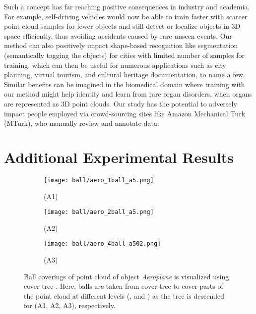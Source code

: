\documentclass{article}
\begin{document}
Such a concept has far reaching positive consequences in industry and academia. For example, self-driving vehicles would now be able to train faster with scarcer point cloud samples for fewer objects and still detect or localize objects in 3D space efficiently, thus avoiding accidents caused by rare unseen events.
Our method can also positively impact shape-based recognition like segmentation (semantically tagging the objects) for cities with limited number of samples for training, which can then be useful for numerous applications such as city planning, virtual tourism, and cultural heritage documentation, to name a few. Similar benefits can be imagined in the biomedical domain where training with our method might help identify and learn from rare organ disorders, when organs are represented as 3D point clouds. Our study has the potential to adversely impact people employed via crowd-sourcing sites like Amazon Mechanical Turk (MTurk), who manually review and annotate data.




\clearpage



\appendix
\section{Additional Experimental Results}
\begin{figure}[tbp]
	\centering
	\begin{subfigure}{.85\textwidth}
		\centering
		\texttt{[image: ball/aero\_1ball\_a5.png]}
		\caption{(A1)}
		\label{fig:ball1}
	\end{subfigure}
	\begin{subfigure}{.85\textwidth}
		\centering
		\texttt{[image: ball/aero\_2ball\_a5.png]}
		\caption{(A2)}
		\label{fig:ball2}
    \end{subfigure}
    \begin{subfigure}{.85\textwidth}
		\centering
		\texttt{[image: ball/aero\_4ball\_a502.png]}
		\caption{(A3)}
		\label{fig:ball3}
	\end{subfigure}
	
	\caption{Ball coverings of point cloud of object \emph{Aeroplane} is visualized using cover-tree . Here, balls are taken from cover-tree to cover parts of the point cloud at different levels (,  and ) as the tree is descended for (A1, A2, A3), respectively.}
	\label{fig:balls}
\end{figure}
\end{document}
